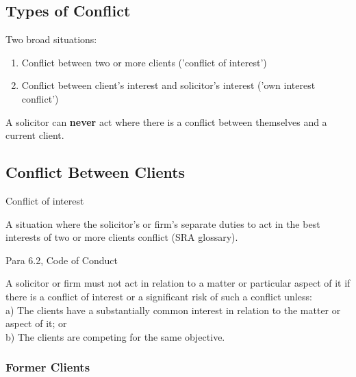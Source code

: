 \documentclass[
]{article}
\providecommand{\tightlist}{%
  \setlength{\itemsep}{0pt}\setlength{\parskip}{0pt}}
\newenvironment{env-28b706cc-8a08-422f-af86-ede86c79505b}
{
    \savenotes\tcolorbox[blanker,breakable,left=5pt,borderline west={2pt}{-4pt}{green}]
}
{
    \endtcolorbox\spewnotes
}
\newenvironment{env-86a00e9b-0e00-4fe8-86cd-090a54119c0f}
{
    \savenotes\tcolorbox[blanker,breakable,left=5pt,borderline west={2pt}{-4pt}{gold}]
}
{
    \endtcolorbox\spewnotes
}
\begin{document}
\hypertarget{types-of-conflict}{%
\subsection{Types of Conflict}\label{types-of-conflict}}

Two broad situations:

\begin{enumerate}
\tightlist
\item
  Conflict between two or more clients ('conflict of interest')
\item
  Conflict between client's interest and solicitor's interest ('own
  interest conflict')
\end{enumerate}

A solicitor can \textbf{never} act where there is a conflict between
themselves and a current client.

\hypertarget{conflict-between-clients}{%
\subsection{Conflict Between Clients}\label{conflict-between-clients}}

\begin{env-86a00e9b-0e00-4fe8-86cd-090a54119c0f}

Conflict of interest

A situation where the solicitor's or firm's separate duties to act in
the best interests of two or more clients conflict (SRA glossary).

\end{env-86a00e9b-0e00-4fe8-86cd-090a54119c0f}

\begin{env-28b706cc-8a08-422f-af86-ede86c79505b}

Para 6.2, Code of Conduct

A solicitor or firm must not act in relation to a matter or particular
aspect of it if there is a conflict of interest or a significant risk of
such a conflict unless:\\
a) The clients have a substantially common interest in relation to the
matter or aspect of it; or\\
b) The clients are competing for the same objective.

\end{env-28b706cc-8a08-422f-af86-ede86c79505b}

\hypertarget{former-clients}{%
\subsubsection{Former Clients}\label{former-clients}}
\end{document}

